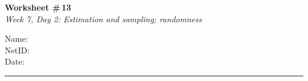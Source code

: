 \documentclass[11pt]{article}
\begin{document}
\noindent
\begin{minipage}[t]{0.55\textwidth}
  \vspace{0pt}
  {\LARGE \textbf{Worksheet \#\,13}} \\[0.3em]
  {\large \textit{Week 7, Day 2: Estimation and sampling; randomness}}
\end{minipage}
\hfill
\begin{minipage}[t]{0.40\textwidth}
  \vspace{0pt}
  \begin{mdframed}[linecolor=black, linewidth=1pt, innertopmargin=10pt, innerbottommargin=10pt]
    \small
    \vspace{0.4cm}
    Name: \underline{\hspace{4.5cm}} \\[1em]
    NetID: \underline{\hspace{4.3cm}} \\[1em]
    Date: \underline{\hspace{4.4cm}} \\
  \end{mdframed}
\end{minipage}

\vspace{1em}
\noindent\rule{\linewidth}{1pt}
\vspace{0.2em}
\end{document}
